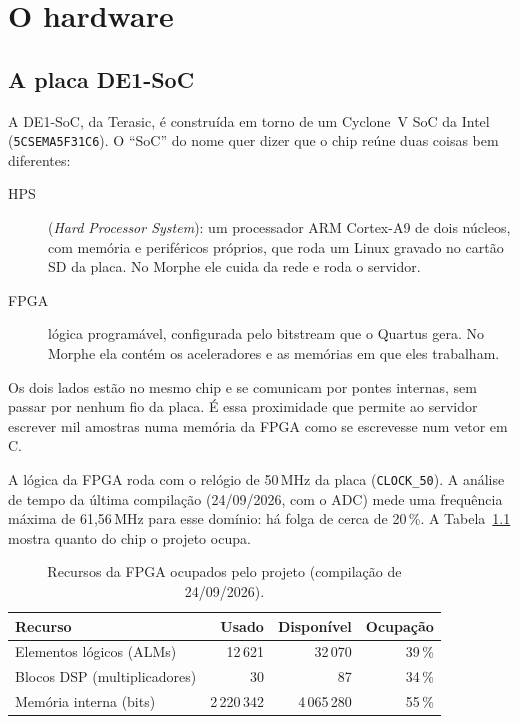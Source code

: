 \chapter{O hardware}
\label{cap:hardware}

\section{A placa DE1-SoC}

A DE1-SoC, da Terasic, é construída em torno de um Cyclone~V SoC da Intel
(\texttt{5CSEMA5F31C6}). O ``SoC'' do nome quer dizer que o chip reúne duas
coisas bem diferentes:

\begin{description}
  \item[HPS] (\emph{Hard Processor System}): um processador ARM Cortex-A9 de
    dois núcleos, com memória e periféricos próprios, que roda um Linux gravado
    no cartão SD da placa. No Morphe ele cuida da rede e roda o servidor.
  \item[FPGA] lógica programável, configurada pelo bitstream que o Quartus gera.
    No Morphe ela contém os aceleradores e as memórias em que eles trabalham.
\end{description}

Os dois lados estão no mesmo chip e se comunicam por pontes internas, sem
passar por nenhum fio da placa. É essa proximidade que permite ao servidor
escrever mil amostras numa memória da FPGA como se escrevesse num vetor em C.

A lógica da FPGA roda com o relógio de 50\,MHz da placa (\texttt{CLOCK\_50}).
A análise de tempo da última compilação (24/09/2026, com o ADC) mede uma
frequência máxima de 61,56\,MHz para esse domínio: há folga de cerca de
20\,\%. A Tabela~\ref{tab:recursos} mostra quanto do chip o projeto ocupa.

\begin{table}[htbp]
  \centering
  \small
  \caption{Recursos da FPGA ocupados pelo projeto (compilação de 24/09/2026).}
  \label{tab:recursos}
  \begin{tabular}{@{}lrrr@{}}
    \toprule
    \textbf{Recurso} & \textbf{Usado} & \textbf{Disponível} & \textbf{Ocupação} \\
    \midrule
    Elementos lógicos (ALMs)      & 12\,621 & 32\,070 & 39\,\% \\
    Blocos DSP (multiplicadores)  & 30      & 87      & 34\,\% \\
    Memória interna (bits)        & 2\,220\,342 & 4\,065\,280 & 55\,\% \\
    \bottomrule
  \end{tabular}
\end{table}

